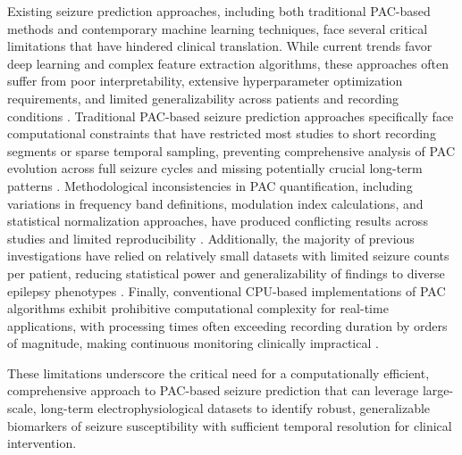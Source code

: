 	Existing seizure prediction approaches, including both traditional PAC-based methods and contemporary machine learning techniques, face several critical limitations that have hindered clinical translation. While current trends favor deep learning and complex feature extraction algorithms, these approaches often suffer from poor interpretability, extensive hyperparameter optimization requirements, and limited generalizability across patients and recording conditions . Traditional PAC-based seizure prediction approaches specifically face computational constraints that have restricted most studies to short recording segments or sparse temporal sampling, preventing comprehensive analysis of PAC evolution across full seizure cycles and missing potentially crucial long-term patterns . Methodological inconsistencies in PAC quantification, including variations in frequency band definitions, modulation index calculations, and statistical normalization approaches, have produced conflicting results across studies and limited reproducibility . Additionally, the majority of previous investigations have relied on relatively small datasets with limited seizure counts per patient, reducing statistical power and generalizability of findings to diverse epilepsy phenotypes . Finally, conventional CPU-based implementations of PAC algorithms exhibit prohibitive computational complexity for real-time applications, with processing times often exceeding recording duration by orders of magnitude, making continuous monitoring clinically impractical . 

	These limitations underscore the critical need for a computationally efficient, comprehensive approach to PAC-based seizure prediction that can leverage large-scale, long-term electrophysiological datasets to identify robust, generalizable biomarkers of seizure susceptibility with sufficient temporal resolution for clinical intervention. 

